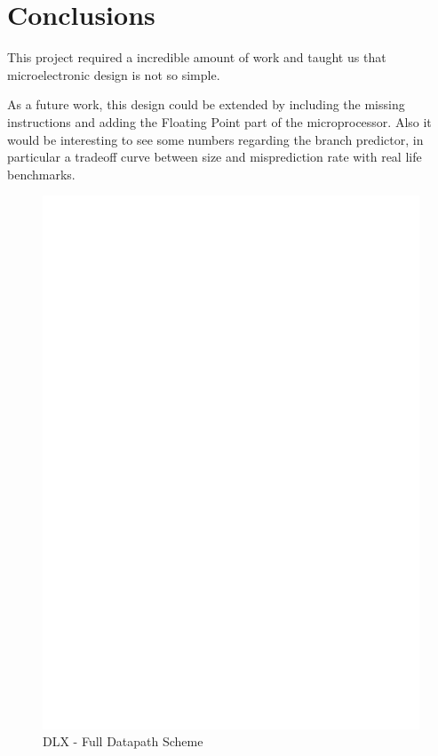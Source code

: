 \documentclass[12pt]{article}
\begin{document}
\section{Conclusions}\label{Conclusions}
This project required a incredible amount of work and taught us that microelectronic design is not so simple.

As a future work, this design could be extended by including the missing instructions and adding the Floating Point part of the microprocessor. 
Also it would be interesting to see some numbers regarding the branch predictor, in particular a tradeoff curve between size and misprediction rate with real life benchmarks.


\printbibliography

\begin{landscape}
	\begin{figure}[!ht]
		\includegraphics[height=1\textheight,center]{images/SCHEME_DLX_FW.eps}
		\caption{DLX - Full Datapath Scheme}
		\label{FULLDLX}
	\end{figure}
	\end{landscape}
\end{document}
